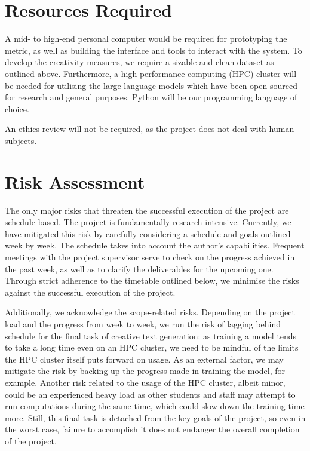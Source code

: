 \documentclass[a4paper,12pt]{article}
\newcommand{\ajs}[1]{\textcolor{orange}{[AJS: #1]}}
\begin{document}
\section*{Resources Required}
A mid- to high-end personal computer would be required for prototyping the metric, as well as building the interface and tools to interact with the system.
To develop the creativity measures, we require a sizable and clean dataset as outlined above.  
Furthermore, a high-performance computing (HPC) cluster will be needed for utilising the large language models which have been open-sourced for research and general purposes. 
Python will be our programming language of choice.

An ethics review will not be required, as the project does not deal with human subjects. 

\section*{Risk Assessment}

The only major risks that threaten the successful execution of the project are schedule-based. The project is fundamentally research-intensive. Currently, we have mitigated this risk by carefully considering a schedule and goals outlined week by week. The schedule takes into account the author's capabilities.
Frequent meetings with the project supervisor serve to check on the progress achieved in the past week, as well as to clarify the deliverables for the upcoming one. Through strict adherence to the timetable outlined below, we minimise the risks against the successful execution of the project. 

Additionally, we acknowledge the scope-related risks. Depending on the project load and the progress from week to week, we run the risk of lagging behind schedule for the final task of creative text generation: as training a model tends to take a long time even on an HPC cluster, we need to be mindful of the limits the HPC cluster itself puts forward on usage. As an external factor, we may mitigate the risk by backing up the progress made in training the model, for example. Another risk related to the usage of the HPC cluster, albeit minor, could be an experienced heavy load as other students and staff may attempt to run computations during the same time, which could slow down the training time more. Still, this final task is detached from the key goals of the project, so even in the worst case, failure to accomplish it does not endanger the overall completion of the project.   
\end{document}
